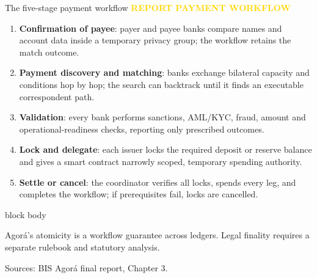\documentclass[aspectratio=169,12pt]{beamer}
\newcommand{\rust}[1]{\textcolor{Rust}{\textbf{#1}}}
\newcommand{\source}[1]{\vfill\par\fontsize{5.4}{6.5}\selectfont\color{Quiet}Sources: #1}
\newcommand{\tightitems}{\setlength{\itemsep}{0.42em}\setlength{\parskip}{0pt}}
\newcommand{\reporttag}[1]{\textcolor{Gold}{\fontsize{7.2}{8.5}\selectfont\bfseries REPORT #1}}
\newenvironment{statement}{%
  \begin{beamercolorbox}[sep=.18cm,rounded=false,wd=\linewidth]{block body}%
  \fontsize{13}{15.5}\selectfont\bfseries
}{\end{beamercolorbox}}
\begin{document}
\begin{frame}[shrink=35]{The five-stage payment workflow}
  \reporttag{PAYMENT WORKFLOW}\par\vspace{0.06cm}
  \fontsize{8.2}{9.8}\selectfont
  \begin{enumerate}\tightitems
    \item \rust{Confirmation of payee}: payer and payee banks compare names and account data inside a temporary privacy group; the workflow retains the match outcome.
    \item \rust{Payment discovery and matching}: banks exchange bilateral capacity and conditions hop by hop; the search can backtrack until it finds an executable correspondent path.
    \item \rust{Validation}: every bank performs sanctions, AML/KYC, fraud, amount and operational-readiness checks, reporting only prescribed outcomes.
    \item \rust{Lock and delegate}: each issuer locks the required deposit or reserve balance and gives a smart contract narrowly scoped, temporary spending authority.
    \item \rust{Settle or cancel}: the coordinator verifies all locks, spends every leg, and completes the workflow; if prerequisites fail, locks are cancelled.
  \end{enumerate}
  \begin{statement}
    Agor\'a's atomicity is a workflow guarantee across ledgers. Legal finality requires a separate rulebook and statutory analysis.
  \end{statement}
  \source{BIS Agor\'a final report, Chapter 3.}
\end{frame}
\end{document}

